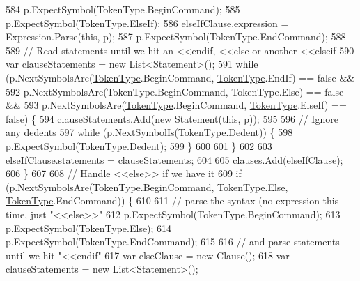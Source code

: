 \begin{DoxyCode}
584                     p.ExpectSymbol(TokenType.BeginCommand);
585                     p.ExpectSymbol(TokenType.ElseIf);
586                     elseIfClause.expression = Expression.Parse(\textcolor{keyword}{this}, p);
587                     p.ExpectSymbol(TokenType.EndCommand);
588 
589                     \textcolor{comment}{// Read statements until we hit an <<endif, <<else or another <<elseif}
590                     var clauseStatements = \textcolor{keyword}{new} List<Statement>();
591                     \textcolor{keywordflow}{while} (p.NextSymbolsAre(\hyperlink{a00026_a301aa7c866593a5b625a8fc158bbeace}{TokenType}.BeginCommand, 
      \hyperlink{a00026_a301aa7c866593a5b625a8fc158bbeace}{TokenType}.EndIf) == \textcolor{keyword}{false} &&
592                         p.NextSymbolsAre(TokenType.BeginCommand, TokenType.Else) == \textcolor{keyword}{false} &&
593                         p.NextSymbolsAre(\hyperlink{a00026_a301aa7c866593a5b625a8fc158bbeace}{TokenType}.BeginCommand, 
      \hyperlink{a00026_a301aa7c866593a5b625a8fc158bbeace}{TokenType}.ElseIf) == \textcolor{keyword}{false}) \{
594                         clauseStatements.Add(\textcolor{keyword}{new} Statement(\textcolor{keyword}{this}, p));
595 
596                         \textcolor{comment}{// Ignore any dedents}
597                         \textcolor{keywordflow}{while} (p.NextSymbolIs(\hyperlink{a00026_a301aa7c866593a5b625a8fc158bbeace}{TokenType}.Dedent)) \{
598                             p.ExpectSymbol(TokenType.Dedent);
599                         \}
600 
601                     \}
602 
603                     elseIfClause.statements = clauseStatements;
604 
605                     clauses.Add(elseIfClause);
606                 \}
607 
608                 \textcolor{comment}{// Handle <<else>> if we have it}
609                 \textcolor{keywordflow}{if} (p.NextSymbolsAre(\hyperlink{a00026_a301aa7c866593a5b625a8fc158bbeace}{TokenType}.BeginCommand, \hyperlink{a00026_a301aa7c866593a5b625a8fc158bbeace}{TokenType}.Else, 
      \hyperlink{a00026_a301aa7c866593a5b625a8fc158bbeace}{TokenType}.EndCommand)) \{
610 
611                     \textcolor{comment}{// parse the syntax (no expression this time, just "<<else>>"}
612                     p.ExpectSymbol(TokenType.BeginCommand);
613                     p.ExpectSymbol(TokenType.Else);
614                     p.ExpectSymbol(TokenType.EndCommand);
615 
616                     \textcolor{comment}{// and parse statements until we hit "<<endif"}
617                     var elseClause = \textcolor{keyword}{new} Clause();
618                     var clauseStatements = \textcolor{keyword}{new} List<Statement>();

\end{DoxyCode}
